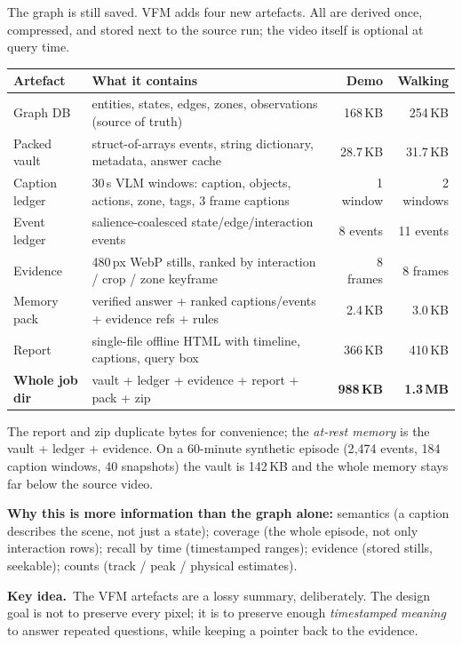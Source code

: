 \documentclass[10pt,a4paper]{article}
\newcommand{\keyidea}[1]{%
  \par\medskip\noindent\colorbox{panel}{%
    \begin{minipage}{\dimexpr\linewidth-2\fboxsep\relax}
    \vspace{2pt}\textbf{\textcolor{accent}{Key idea.}}\ #1\vspace{2pt}
    \end{minipage}}\par\medskip
}
\begin{document}
The graph is still saved. VFM adds four new artefacts. All are derived once, compressed, and stored
next to the source run; the video itself is optional at query time.

\begin{center}
\small
\begin{tabularx}{\linewidth}{@{}L L r r@{}}
\toprule
\textbf{Artefact} & \textbf{What it contains} & \textbf{Demo} & \textbf{Walking} \\
\midrule
Graph DB & entities, states, edges, zones, observations (source of truth) & 168\,KB & 254\,KB \\
Packed vault & struct-of-arrays events, string dictionary, metadata, answer cache & 28.7\,KB & 31.7\,KB \\
Caption ledger & 30\,s VLM windows: caption, objects, actions, zone, tags, 3 frame captions & 1 window & 2 windows \\
Event ledger & salience-coalesced state/edge/interaction events & 8 events & 11 events \\
Evidence & 480\,px WebP stills, ranked by interaction / crop / zone keyframe & 8 frames & 8 frames \\
Memory pack & verified answer + ranked captions/events + evidence refs + rules & 2.4\,KB & 3.0\,KB \\
Report & single-file offline HTML with timeline, captions, query box & 366\,KB & 410\,KB \\
\midrule
\textbf{Whole job dir} & vault + ledger + evidence + report + pack + zip & \textbf{988\,KB} & \textbf{1.3\,MB} \\
\bottomrule
\end{tabularx}
\end{center}

\noindent
The report and zip duplicate bytes for convenience; the \emph{at-rest memory} is the vault + ledger +
evidence. On a 60-minute synthetic episode (2{,}474 events, 184 caption windows, 40 snapshots) the
vault is 142\,KB and the whole memory stays far below the source video.

\noindent
\textbf{Why this is more information than the graph alone:} semantics (a caption describes the
scene, not just a state); coverage (the whole episode, not only interaction rows); recall by time
(timestamped ranges); evidence (stored stills, seekable); counts (track / peak / physical estimates).

\keyidea{The VFM artefacts are a lossy summary, deliberately. The design goal is not to preserve
every pixel; it is to preserve enough \emph{timestamped meaning} to answer repeated questions, while
keeping a pointer back to the evidence.}
\end{document}
